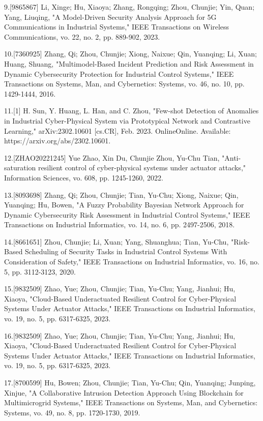 9.[9865867] Li, Xinge; Hu, Xiaoya; Zhang, Rongqing; Zhou, Chunjie; Yin, Quan; Yang, Liuqing, "A Model-Driven Security Analysis Approach for 5G Communications in Industrial Systems," IEEE Transactions on Wireless Communications, vo. 22, no. 2, pp. 889-902, 2023.

10.[7360925] Zhang, Qi; Zhou, Chunjie; Xiong, Naixue; Qin, Yuanqing; Li, Xuan; Huang, Shuang, "Multimodel-Based Incident Prediction and Risk Assessment in Dynamic Cybersecurity Protection for Industrial Control Systems," IEEE Transactions on Systems, Man, and Cybernetics: Systems, vo. 46, no. 10, pp. 1429-1444, 2016.

11.[1] H. Sun, Y. Huang, L. Han, and C. Zhou, "Few-shot Detection of Anomalies in Industrial Cyber-Physical System via Prototypical Network and Contrastive Learning," arXiv:2302.10601 [cs.CR], Feb. 2023. OnlineOnline. Available: https://arxiv.org/abs/2302.10601.

12.[ZHAO20221245] Yue Zhao, Xin Du, Chunjie Zhou, Yu-Chu Tian, "Anti-saturation resilient control of cyber-physical systems under actuator attacks," Information Sciences, vo. 608, pp. 1245-1260, 2022.

13.[8093698] Zhang, Qi; Zhou, Chunjie; Tian, Yu-Chu; Xiong, Naixue; Qin, Yuanqing; Hu, Bowen, "A Fuzzy Probability Bayesian Network Approach for Dynamic Cybersecurity Risk Assessment in Industrial Control Systems," IEEE Transactions on Industrial Informatics, vo. 14, no. 6, pp. 2497-2506, 2018.

14.[8661651] Zhou, Chunjie; Li, Xuan; Yang, Shuanghua; Tian, Yu-Chu, "Risk-Based Scheduling of Security Tasks in Industrial Control Systems With Consideration of Safety," IEEE Transactions on Industrial Informatics, vo. 16, no. 5, pp. 3112-3123, 2020.

15.[9832509] Zhao, Yue; Zhou, Chunjie; Tian, Yu-Chu; Yang, Jianhui; Hu, Xiaoya, "Cloud-Based Underactuated Resilient Control for Cyber-Physical Systems Under Actuator Attacks," IEEE Transactions on Industrial Informatics, vo. 19, no. 5, pp. 6317-6325, 2023.

16.[9832509] Zhao, Yue; Zhou, Chunjie; Tian, Yu-Chu; Yang, Jianhui; Hu, Xiaoya, "Cloud-Based Underactuated Resilient Control for Cyber-Physical Systems Under Actuator Attacks," IEEE Transactions on Industrial Informatics, vo. 19, no. 5, pp. 6317-6325, 2023.

17.[8700599] Hu, Bowen; Zhou, Chunjie; Tian, Yu-Chu; Qin, Yuanqing; Junping, Xinjue, "A Collaborative Intrusion Detection Approach Using Blockchain for Multimicrogrid Systems," IEEE Transactions on Systems, Man, and Cybernetics: Systems, vo. 49, no. 8, pp. 1720-1730, 2019.

